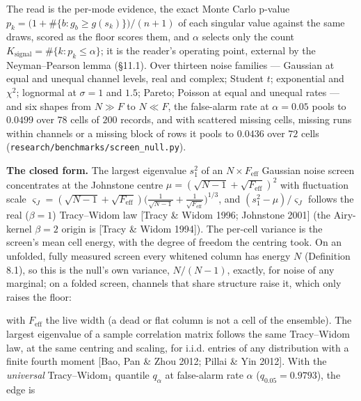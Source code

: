 \documentclass[10pt,letterpaper,twocolumn]{article}
\begin{document}
The read is the per-mode evidence, the exact Monte Carlo p-value \(p_k=\big(1+\#\{b:g_b\ge g(s_k)\}\big)/(n+1)\) of each singular value against the same draws, scored as the floor scores them, and \(\alpha\) selects only the count \(K_{\mathrm{signal}}=\#\{k:p_k\le\alpha\}\); it is the reader's operating point, external by the Neyman--Pearson lemma (§11.1). Over thirteen noise families --- Gaussian at equal and unequal channel levels, real and complex; Student \(t\); exponential and \(\chi^2\); lognormal at \(\sigma=1\) and \(1.5\); Pareto; Poisson at equal and unequal rates --- and six shapes from \(N\gg F\) to \(N\ll F\), the false-alarm rate at \(\alpha=0.05\) pools to \(0.0499\) over \(78\) cells of \(200\) records, and with scattered missing cells, missing runs within channels or a missing block of rows it pools to \(0.0436\) over \(72\) cells (\texttt{research/\allowbreak{}benchmarks/\allowbreak{}screen\_\allowbreak{}null.\allowbreak{}py}).

\textbf{The closed form.} The largest eigenvalue \(s_1^2\) of an \(N\times F_{\mathrm{eff}}\) Gaussian noise screen concentrates at the Johnstone centre \(\mu=(\sqrt{N-1}+\sqrt{F_{\mathrm{eff}}})^2\) with fluctuation scale \(\varsigma_J=(\sqrt{N-1}+\sqrt{F_{\mathrm{eff}}})\big(\tfrac1{\sqrt{N-1}}+\tfrac1{\sqrt{F_{\mathrm{eff}}}}\big)^{1/3}\), and \((s_1^2-\mu)/\varsigma_J\) follows the real (\(\beta=1\)) Tracy--Widom law {[}Tracy \& Widom 1996; Johnstone 2001{]} (the Airy-kernel \(\beta=2\) origin is {[}Tracy \& Widom 1994{]}). The per-cell variance is the screen's mean cell energy, with the degree of freedom the centring took. On an unfolded, fully measured screen every whitened column has energy \(N\) (Definition 8.1), so this is the null's own variance, \(N/(N-1)\), exactly, for noise of any marginal; on a folded screen, channels that share structure raise it, which only raises the floor:


with \(F_{\mathrm{eff}}\) the live width (a dead or flat column is not a cell of the ensemble). The largest eigenvalue of a sample correlation matrix follows the same Tracy--Widom law, at the same centring and scaling, for i.i.d. entries of any distribution with a finite fourth moment {[}Bao, Pan \& Zhou 2012; Pillai \& Yin 2012{]}. With the \emph{universal} Tracy--Widom\(_1\) quantile \(q_\alpha\) at false-alarm rate \(\alpha\) (\(q_{0.05}=0.9793\)), the edge is

\end{document}
